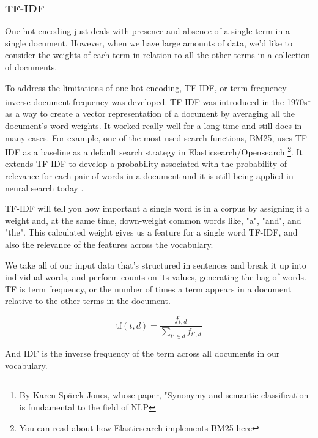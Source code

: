 \documentclass[11pt, table]{diazessay} %
\begin{document}
\begin{sloppypar}
\subsubsection{TF-IDF}

One-hot encoding just deals with presence and absence of a single term in a single document. However, when we have large amounts of data, we'd like to consider the weights of each term in relation to all the other terms in a collection of documents.

To address the limitations of one-hot encoding, TF-IDF, or term frequency-inverse document frequency was developed. TF-IDF was introduced in the 1970s\footnote{By Karen Spärck Jones, whose paper, \href{https://blog.babbar.tech/who-is-karen-sparck-jones/}{"Synonymy and semantic classification} is fundamental to the field of NLP} as a way to create a vector representation of a document by averaging all the document's word weights. It worked really well for a long time and still does in many cases.  For example, one of the most-used search functions, BM25, uses TF-IDF as a baseline  \citep{schutze2008introduction} as a default search strategy in Elasticsearch/Opensearch \footnote{You can read about how Elasticsearch implements BM25 \href{https://www.elastic.co/blog/practical-bm25-part-1-how-shards-affect-relevance-scoring-in-elasticsearch}{here}}. It extends TF-IDF to develop a probability associated with the probability of relevance for each pair of words in a document and it is still being applied in neural search today  \citep{svore2009machine}.  

TF-IDF will tell you how important a single word is in a corpus by assigning it a weight and, at the same time, down-weight common words like, "a", "and", and "the". This calculated weight gives us a feature for a single word TF-IDF, and also the relevance of the features across the vocabulary.

We take all of our input data that's structured in sentences and break it up into individual words, and perform counts on its values, generating the bag of words. TF is term frequency, or the number of times a term appears in a document relative to the other terms in the document.

\begin{equation}
\mathrm{tf}(t,d) = \frac{f_{t,d}}{{\sum_{t' \in d}{f_{t',d}}}}
\end{equation}

And IDF is the inverse frequency of the term across all documents in our vocabulary.


\end{sloppypar}
\end{document}
